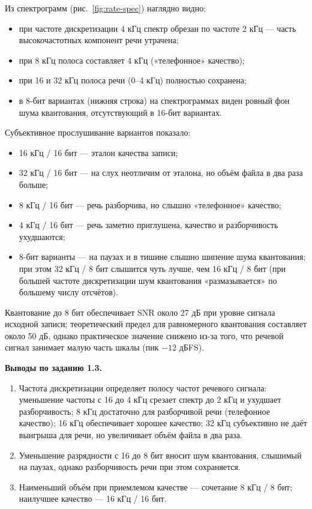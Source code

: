 Из спектрограмм (рис.~\ref{fig:rate-spec}) наглядно видно:
\begin{itemize}
	\item при частоте дискретизации 4 кГц спектр обрезан по частоте 2 кГц
		--- часть высокочастотных компонент речи утрачена;
	\item при 8 кГц полоса составляет 4 кГц («телефонное» качество);
	\item при 16 и 32 кГц полоса речи (0--4 кГц) полностью сохранена;
	\item в 8-бит вариантах (нижняя строка) на спектрограммах виден
		ровный фон шума квантования, отсутствующий в 16-бит вариантах.
\end{itemize}

Субъективное прослушивание вариантов показало:
\begin{itemize}
	\item 16 кГц / 16 бит --- эталон качества записи;
	\item 32 кГц / 16 бит --- на слух неотличим от эталона, но объём
		файла в два раза больше;
	\item 8 кГц / 16 бит --- речь разборчива, но слышно «телефонное»
		качество;
	\item 4 кГц / 16 бит --- речь заметно приглушена, качество и
		разборчивость ухудшаются;
	\item 8-бит варианты --- на паузах и в тишине слышно шипение шума
		квантования; при этом 32 кГц / 8 бит слышится чуть лучше, чем
		16 кГц / 8 бит (при большей частоте дискретизации шум
		квантования «размазывается» по большему числу отсчётов).
\end{itemize}

Квантование до 8 бит обеспечивает SNR около 27 дБ при уровне сигнала
исходной записи; теоретический предел для равномерного квантования
составляет около 50 дБ, однако практическое значение снижено из-за того,
что речевой сигнал занимает малую часть шкалы (пик $-12$ дБFS).

\textbf{Выводы по заданию 1.3.}
\begin{enumerate}
	\item Частота дискретизации определяет полосу частот речевого
		сигнала: уменьшение частоты с 16 до 4 кГц срезает спектр до
		2 кГц и ухудшает разборчивость; 8 кГц достаточно для
		разборчивой речи (телефонное качество); 16 кГц обеспечивает
		хорошее качество; 32 кГц субъективно не даёт выигрыша для речи,
		но увеличивает объём файла в два раза.
	\item Уменьшение разрядности с 16 до 8 бит вносит шум квантования,
		слышимый на паузах, однако разборчивость речи при этом
		сохраняется.
	\item Наименьший объём при приемлемом качестве --- сочетание
		8 кГц / 8 бит; наилучшее качество --- 16 кГц / 16 бит.
\end{enumerate}

